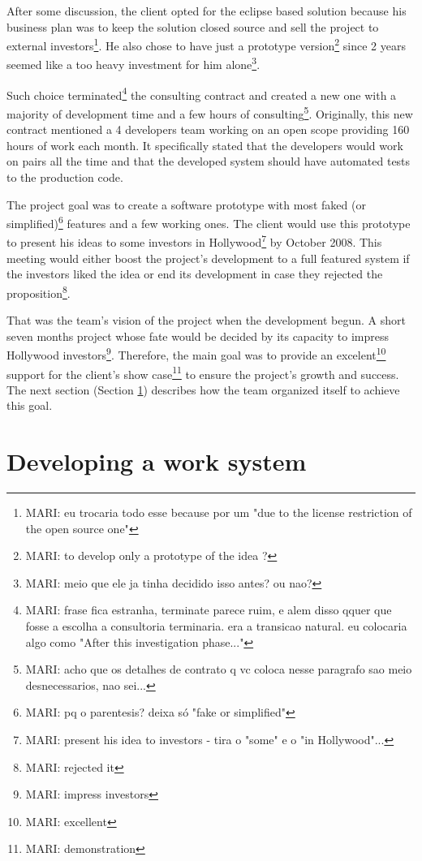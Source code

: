 \documentclass[lnbip]{svmultln}
\newcommand{\mari}[1]{\footnote{MARI: #1}}
\begin{document}
After some discussion, the client opted for the eclipse based solution because his business plan was to keep the solution closed source and sell the project to external investors\mari{eu trocaria todo esse because por um "due to the license restriction of the open source one"}. He also chose to have just a prototype version\mari{to develop only a prototype of the idea ?} since 2 years seemed like a too heavy investment for him alone\mari{meio que ele ja tinha decidido isso antes? ou nao?}.

Such choice terminated\mari{frase fica estranha, terminate parece ruim, e alem disso qquer que fosse a escolha a consultoria terminaria. era a transicao natural. eu colocaria algo como "After this investigation phase..."} the consulting contract and created a new one with a majority of development time and a few hours of consulting\mari{acho que os detalhes de contrato q vc coloca nesse paragrafo sao meio desnecessarios, nao sei...}. Originally, this new contract mentioned a 4 developers team working on an open scope providing 160 hours of work each month. It specifically stated that the developers would work on pairs all the time and that the developed system should have automated tests to the production code.

The project goal was to create a software prototype with most faked (or simplified)\mari{pq o parentesis? deixa só "fake or simplified"} features and a few working ones. The client would use this prototype to present his ideas to some investors in Hollywood\mari{present his idea to investors - tira o "some" e o "in Hollywood"...} by October 2008. This meeting would either boost the project's development to a full featured system if the investors liked the idea or end its development in case they rejected the proposition\mari{rejected it}.

That was the team's vision of the project when the development begun. A short seven months project whose fate would be decided by its capacity to impress Hollywood investors\mari{impress investors}. Therefore, the main goal was to provide an excelent\mari{excellent} support for the client's show case\mari{demonstration} to ensure the project's growth and success. The next section (Section \ref{sec:working}) describes how the team organized itself to achieve this goal.

\section{Developing a work system}
\label{sec:working}
\end{document}

